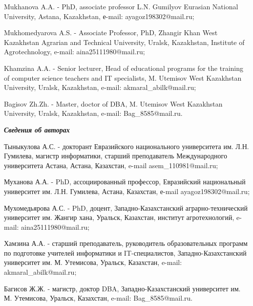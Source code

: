 Mukhanova A.A. - PhD, associate professor L.N. Gumilyov Eurasian
National University, Astana, Kazakhstan, е-mail: ayagoz198302@mail.ru;

Mukhomedyarova A.S. - Associate Professor, PhD, Zhangir Khan West
Kazakhstan Agrarian and Technical University, Uralsk, Kazakhstan,
Institute of Agrotechnology, e-mail: aina25111980@mail.ru;

Khamzina A.A. - Senior lecturer, Head of educational programs for the
training of computer science teachers and IT specialists, M. Utemisov
West Kazakhstan University, Uralsk, Kazakhstan, e-mail:
akmaral\_abilk@mail.ru;

Bagisov Zh.Zh. - Master, doctor of DBA, M. Utemisov West Kazakhstan
University, Uralsk, Kazakhstan, e-mail: Bag\_8585@mail.ru.

\emph{\textbf{Сведения об авторах}}

Тыныкулова А.С. - докторант Евразийского национального университета им.
Л.Н. Гумилева, магистр информатики, старший преподаватель Международного
университета Астана, Астана, Казахстан, e-mail asem\_110981@mail.ru;

Муханова А.А. - PhD, ассоциированный профессор, Евразийский национальный
университет им. Л.Н. Гумилева, Астана, Казахстан, е-mail
ayagoz198302@mail.ru;

Мухомедьярова А.С. - PhD, доцент, Западно-Казахстанский
аграрно-технический университет им. Жангир хана, Уральск, Казахстан,
институт агротехнологий, e-mail: aina25111980@mail.ru;

Хамзина А.А. - старший преподаватель, руководитель образовательных
программ по подготовке учителей информатики и IT-специалистов,
Западно-Казахстанский университет им. М. Утемисова, Уральск, Казахстан,
e-mail: akmaral\_abilk@mail.ru;

Багисов Ж.Ж. - магистр, доктор DBA, Западно-Казахстанский университет
им. М. Утемисова, Уральск, Казахстан, e-mail: Bag\_8585@mail.ru.
